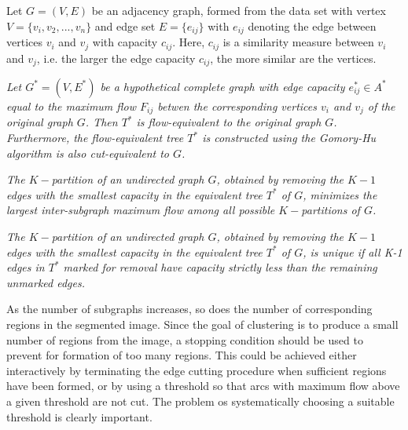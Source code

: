             Let $G = (V,E)$ be an adjacency graph, formed from the data set with vertex $V = \{v_i,v_2,...,v_n\}$ and edge set $E = \{e_{ij}\}$ with $e_{ij}$ denoting the edge between vertices $v_i$ and $v_j$ with capacity $c_{ij}$. Here, $c_{ij}$ is a similarity measure between $v_i$ and $v_j$, i.e. the larger the edge capacity $c_{ij}$, the more similar are the vertices.

            \vspace{5mm}
             \textit{Let $G^* = (V,E^*)$ be a hypothetical complete graph with
            edge capacity $e^*_{ij} \in A^*$ equal to the maximum flow $F_{ij}$ betwen the corresponding vertices $v_i$ and $v_j$ of the original graph $G$. Then $T^*$ is flow-equivalent to the original graph $G$. Furthermore, the flow-equivalent tree $T^*$ is constructed using the Gomory-Hu algorithm is also cut-equivalent to $G$.
            }

            \vspace{5mm}
             \textit{
                The $K-$partition of an undirected graph $G$, obtained by removing the $K-1$ edges with the smallest capacity in the equivalent tree $T^*$ of $G$, minimizes the largest inter-subgraph maximum flow among all possible $K-$partitions of $G$.
            }

            \vspace{5mm}
             \textit{
                The $K-$partition of an undirected graph $G$, obtained by removing the $K-1$ edges with the smallest capacity in the equivalent tree $T^*$ of $G$, is unique if all K-1 edges in $T^*$ marked for removal have capacity strictly less than the remaining unmarked edges.
            }

            \vspace{3mm}
            \noindent As the number of subgraphs increases, so does the number of corresponding regions in the segmented image. Since the goal of clustering is to produce a small number of regions from the image, a stopping condition should be used to prevent for formation of too many regions. This could be achieved either interactively by terminating the edge cutting procedure when sufficient regions have been formed, or by using a threshold so that arcs with maximum flow above a given threshold are not cut. The problem os systematically choosing a suitable threshold is clearly important.

